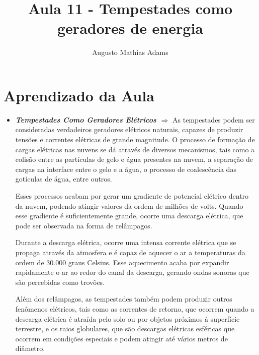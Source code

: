 \documentclass[a4paper, 12pt, onecolumn,singlespacing]{article}
\title{Aula 11 - Tempestades como geradores de energia}
\author[1]{Augusto Mathias Adams}
\affil[1]{augusto.adams@ufpr.br}
\begin{document}
	
	\maketitle
	
	\section{Aprendizado da Aula}
	
	\begin{itemize}
		
		\item \textbf{\textit{Tempestades Como Geradores Elétricos $\Rightarrow$ }}As tempestades podem ser consideradas verdadeiros geradores elétricos naturais, capazes de produzir tensões e correntes elétricas de grande magnitude. O processo de formação de cargas elétricas nas nuvens se dá através de diversos mecanismos, tais como a colisão entre as partículas de gelo e água presentes na nuvem, a separação de cargas na interface entre o gelo e a água, o processo de coalescência das gotículas de água, entre outros.
		
		Esses processos acabam por gerar um gradiente de potencial elétrico dentro da nuvem, podendo atingir valores da ordem de milhões de volts. Quando esse gradiente é suficientemente grande, ocorre uma descarga elétrica, que pode ser observada na forma de relâmpagos.
		
		Durante a descarga elétrica, ocorre uma intensa corrente elétrica que se propaga através da atmosfera e é capaz de aquecer o ar a temperaturas da ordem de 30.000 graus Celsius. Esse aquecimento acaba por expandir rapidamente o ar ao redor do canal da descarga, gerando ondas sonoras que são percebidas como trovões.
		
		Além dos relâmpagos, as tempestades também podem produzir outros fenômenos elétricos, tais como as correntes de retorno, que ocorrem quando a descarga elétrica é atraída pelo solo ou por objetos próximos à superfície terrestre, e os raios globulares, que são descargas elétricas esféricas que ocorrem em condições especiais e podem atingir até vários metros de diâmetro.
	
	\end{itemize}
	
\end{document}
